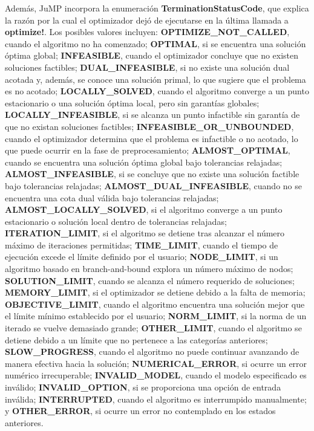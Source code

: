 Además, JuMP incorpora la enumeración \textbf{TerminationStatusCode}, que explica la razón por la cual el optimizador dejó de ejecutarse en la última llamada a \textbf{optimize!}. Los posibles valores incluyen: \textbf{OPTIMIZE\_NOT\_CALLED}, cuando el algoritmo no ha comenzado; \textbf{OPTIMAL}, si se encuentra una solución óptima global; \textbf{INFEASIBLE}, cuando el optimizador concluye que no existen soluciones factibles; \textbf{DUAL\_INFEASIBLE}, si no existe una solución dual acotada y, además, se conoce una solución primal, lo que sugiere que el problema es no acotado; \textbf{LOCALLY\_SOLVED}, cuando el algoritmo converge a un punto estacionario o una solución óptima local, pero sin garantías globales; \textbf{LOCALLY\_INFEASIBLE}, si se alcanza un punto infactible sin garantía de que no existan soluciones factibles; \textbf{INFEASIBLE\_OR\_UNBOUNDED}, cuando el optimizador determina que el problema es infactible o no acotado, lo que puede ocurrir en la fase de preprocesamiento; \textbf{ALMOST\_OPTIMAL}, cuando se encuentra una solución óptima global bajo tolerancias relajadas; \textbf{ALMOST\_INFEASIBLE}, si se concluye que no existe una solución factible bajo tolerancias relajadas; \textbf{ALMOST\_DUAL\_INFEASIBLE}, cuando no se encuentra una cota dual válida bajo tolerancias relajadas; \textbf{ALMOST\_LOCALLY\_SOLVED}, si el algoritmo converge a un punto estacionario o solución local dentro de tolerancias relajadas; \textbf{ITERATION\_LIMIT}, si el algoritmo se detiene tras alcanzar el número máximo de iteraciones permitidas; \textbf{TIME\_LIMIT}, cuando el tiempo de ejecución excede el límite definido por el usuario; \textbf{NODE\_LIMIT}, si un algoritmo basado en branch-and-bound explora un número máximo de nodos; \textbf{SOLUTION\_LIMIT}, cuando se alcanza el número requerido de soluciones; \textbf{MEMORY\_LIMIT}, si el optimizador se detiene debido a la falta de memoria; \textbf{OBJECTIVE\_LIMIT}, cuando el algoritmo encuentra una solución mejor que el límite mínimo establecido por el usuario; \textbf{NORM\_LIMIT}, si la norma de un iterado se vuelve demasiado grande; \textbf{OTHER\_LIMIT}, cuando el algoritmo se detiene debido a un límite que no pertenece a las categorías anteriores; \textbf{SLOW\_PROGRESS}, cuando el algoritmo no puede continuar avanzando de manera efectiva hacia la solución; \textbf{NUMERICAL\_ERROR}, si ocurre un error numérico irrecuperable; \textbf{INVALID\_MODEL}, cuando el modelo especificado es inválido; \textbf{INVALID\_OPTION}, si se proporciona una opción de entrada inválida; \textbf{INTERRUPTED}, cuando el algoritmo es interrumpido manualmente; y \textbf{OTHER\_ERROR}, si ocurre un error no contemplado en los estados anteriores.

